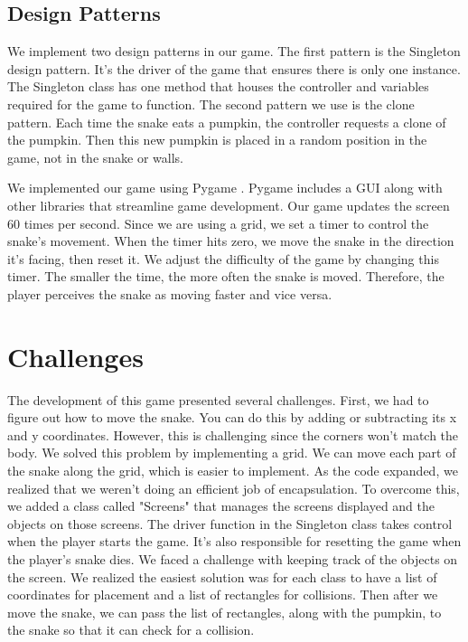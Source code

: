 \documentclass[sigplan,screen]{acmart}
\begin{document}
\subsection{Design Patterns}
We implement two design patterns in our game. The first pattern is the Singleton design pattern. It's the driver of the game that ensures there is only one instance. The Singleton class has one method that houses the controller and variables required for the game to function. The second pattern we use is the clone pattern. Each time the snake eats a pumpkin, the controller requests a clone of the pumpkin. Then this new pumpkin is placed in a random position in the game, not in the snake or walls. 

We implemented our game using Pygame \cite{pygame}. Pygame includes a GUI along with other libraries that streamline game development. Our game updates the screen 60 times per second. Since we are using a grid, we set a timer to control the snake's movement. When the timer hits zero, we move the snake in the direction it's facing, then reset it. We adjust the difficulty of the game by changing this timer. The smaller the time, the more often the snake is moved. Therefore, the player perceives the snake as moving faster and vice versa.

\section{Challenges}
The development of this game presented several challenges. First, we had to figure out how to move the snake. You can do this by adding or subtracting its x and y coordinates. However, this is challenging since the corners won't match the body. We solved this problem by implementing a grid. We can move each part of the snake along the grid, which is easier to implement. As the code expanded, we realized that we weren't doing an efficient job of encapsulation. To overcome this, we added a class called "Screens" that manages the screens displayed and the objects on those screens. The driver function in the Singleton class takes control when the player starts the game. It's also responsible for resetting the game when the player's snake dies. We faced a challenge with keeping track of the objects on the screen. We realized the easiest solution was for each class to have a list of coordinates for placement and a list of rectangles for collisions. Then after we move the snake, we can pass the list of rectangles, along with the pumpkin, to the snake so that it can check for a collision. 
\end{document}
